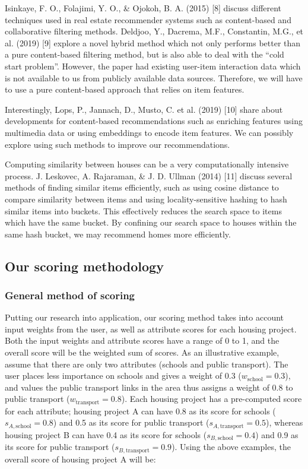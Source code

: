 \documentclass[a4paper, 11pt]{article}
\begin{document}
    Isinkaye, F. O., Folajimi, Y. O., \& Ojokoh, B. A. (2015) [8] discuss different techniques used in real estate recommender systems such as content-based and collaborative filtering methods. Deldjoo, Y., Dacrema, M.F., Constantin, M.G., et al. (2019) [9] explore a novel hybrid method which not only performs better than a pure content-based filtering method, but is also able to deal with the “cold start problem”. However, the paper had existing user-item interaction data which is not available to us from publicly available data sources. Therefore, we will have to use a pure content-based approach that relies on item features.

    Interestingly, Lops, P., Jannach, D., Musto, C. et al. (2019) [10] share about developments for content-based recommendations such as enriching features using multimedia data or using embeddings to encode item features. We can possibly explore using such methods to improve our recommendations.

    Computing similarity between houses can be a very computationally intensive process. J. Leskovec, A. Rajaraman, \& J. D. Ullman (2014) [11] discuss several methods of finding similar items efficiently, such as using cosine distance to compare similarity between items and using locality-sensitive hashing to hash similar items into buckets. This effectively reduces the search space to items which have the same bucket. By confining our search space to houses within the same hash bucket, we may recommend homes more efficiently.

    \subsection{Our scoring methodology}

\subsubsection{General method of scoring}

    Putting our research into application, our scoring method takes into account input weights from the user, as well as attribute scores for each housing project. Both the input weights and attribute scores have a range of 0 to 1, and the overall score will be the weighted sum of scores. As an illustrative example, assume that there are only two attributes (schools and public transport). The user places less importance on schools and gives a weight of  0.3 ($w_{\text{school}}  = 0.3$), and values the public transport links in the area thus assigns a weight of 0.8 to public transport ($w_{\text{transport}}  = 0.8$). Each housing project has a pre-computed score for each attribute; housing project A can have 0.8 as its score for schools ($s_{A,\text{school}} = 0.8$) and 0.5 as its score for public transport ($s_{A,\text{transport}} = 0.5$), whereas housing project B can have 0.4 as its score for schools ($s_{B,\text{school}} = 0.4$) and 0.9 as its score for public transport ($s_{B,\text{transport}} = 0.9$). Using the above examples, the overall score of housing project A will be:
\end{document}
